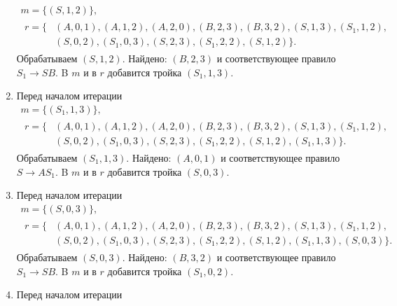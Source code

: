 \begin{example}
\begin{enumerate}
              \begin{gather*}
                  m = \{(S, 1, 2)\}, \\
                  \begin{aligned}
                      r = \{ & (A, 0, 1), (A, 1, 2), (A, 2, 0), (B, 2, 3), (B, 3, 2), (S, 1, 3), (S_1, 1, 2), \\
                             & (S, 0, 2), (S_1, 0, 3), (S, 2, 3), (S_1, 2, 2), (S, 1, 2)\}.
                  \end{aligned}
              \end{gather*}
              Обрабатываем $(S, 1, 2)$.
              Найдено: $(B, 2, 3)$ и соответствующее правило $S_1 \to S B$.
              B $m$ и в $r$ добавится тройка $(S_1, 1, 3)$.
        \item Перед началом итерации
              \begin{gather*}
                  m = \{(S_1, 1, 3)\},\\
                  \begin{aligned}
                      r = \{ & (A, 0, 1), (A, 1, 2), (A, 2, 0), (B, 2, 3), (B, 3, 2), (S, 1, 3), (S_1, 1, 2), \\
                             & (S, 0, 2), (S_1, 0, 3), (S, 2, 3), (S_1, 2, 2), (S, 1, 2), (S_1, 1, 3)\}.
                  \end{aligned}
              \end{gather*}
              Обрабатываем $(S_1, 1, 3)$.
              Найдено: $(A, 0, 1)$ и соответствующее правило $S \to A S_1$.
              B $m$ и в $r$ добавится тройка $(S, 0, 3)$.
        \item Перед началом итерации
              \begin{gather*}
                  m = \{(S, 0, 3)\}, \\
                  \begin{aligned}
                      r = \{ & (A, 0, 1), (A, 1, 2), (A, 2, 0), (B, 2, 3), (B, 3, 2), (S, 1, 3), (S_1, 1, 2),       \\
                             & (S, 0, 2), (S_1, 0, 3), (S, 2, 3), (S_1, 2, 2), (S, 1, 2), (S_1, 1, 3), (S, 0, 3)\}.
                  \end{aligned}
              \end{gather*}
              Обрабатываем $(S, 0, 3)$.
              Найдено: $(B, 3, 2)$ и соответствующее правило $S_1 \to S B$.
              B $m$ и в $r$ добавится тройка $(S_1, 0, 2)$.
        \item Перед началом итерации

\end{enumerate}
\end{example}
